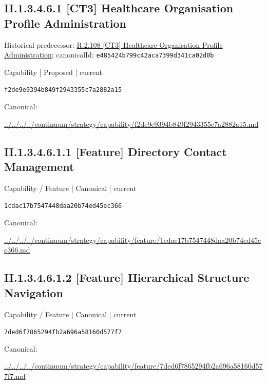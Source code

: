 \documentclass[10pt,a4paper]{article}
\begin{document}
\subsection*{II.1.3.4.6.1 [CT3] Healthcare Organisation Profile Administration}
Historical predecessor: \hyperref[element-e485424b799c42aca7399d341ca02d0b]{R.2.108 [CT3] Healthcare Organisation Profile Administration}; canonicalId: \texttt{e485424b799c42aca7399d341ca02d0b}\par
\label{element-f2de9e9394b849f2943355c7a2882a15}
{\small Capability | Proposed | current}\par
\texttt{f2de9e9394b849f2943355c7a2882a15}\par
Canonical: \par
{\footnotesize\url{../../../../continuum/strategy/capability/f2de9e9394b849f2943355c7a2882a15.md}}\par
\subsection*{II.1.3.4.6.1.1 [Feature] Directory Contact Management}
\label{element-1cdac17b7547448daa20b74ed45ec366}
{\small Capability / Feature | Canonical | current}\par
\texttt{1cdac17b7547448daa20b74ed45ec366}\par
Canonical: \par
{\footnotesize\url{../../../../continuum/strategy/capability/feature/1cdac17b7547448daa20b74ed45ec366.md}}\par
\subsection*{II.1.3.4.6.1.2 [Feature] Hierarchical Structure Navigation}
\label{element-7ded6f7865294fb2a696a58160d577f7}
{\small Capability / Feature | Canonical | current}\par
\texttt{7ded6f7865294fb2a696a58160d577f7}\par
Canonical: \par
{\footnotesize\url{../../../../continuum/strategy/capability/feature/7ded6f7865294fb2a696a58160d577f7.md}}\par
\end{document}
